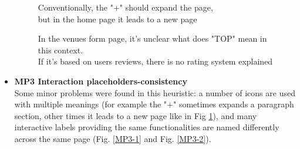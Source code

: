 \begin{itemize}
\begin{figure}[!ht]
\begin{minipage}{\linewidth}
                \captionsetup{justification=centering}
                \caption{Conventionally, the "+" should expand the page,\\
                but in the home page it leads to a new page}
                \label{MP2-1}
            \end{minipage}
        \end{figure}
        \begin{figure}[!ht]
            \begin{minipage}{\linewidth}
                \centering
                \captionsetup{justification=centering}
                \caption{In the venues form page, it's unclear what does "TOP" mean in this context.\\If it's based on users reviews, there is no rating system explained}
                \label{MP2-2}
            \end{minipage}
        \end{figure}
    \item \textbf{MP3 Interaction placeholders-consistency}\\
        Some minor problems were found in this heuristic:
        a number of icons are used with multiple meanings (for example the "+" sometimes expands a paragraph section, other times it leads to a new page like in Fig \ref{MP2-1}), and many interactive labels providing the same functionalities are named differently across the same page (Fig. \ref{MP3-1} and Fig. \ref{MP3-2}).
        \begin{figure}[!ht]
            \begin{minipage}{\linewidth}
                \centering

\end{minipage}
\end{figure}
\end{itemize}
